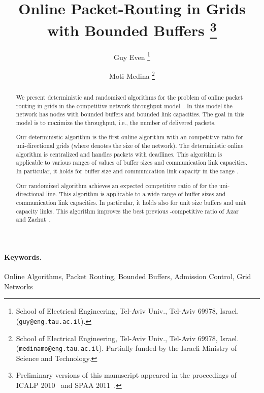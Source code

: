 \documentclass[11pt]{article}
\newenvironment{proof sketch}[1]{\noindent {\emph{Proof sketch of #1:}}}{\hfill \qed}
\begin{document}
 \title{Online Packet-Routing in Grids with Bounded Buffers \thanks{Preliminary
    versions of this manuscript appeared in the proceedings of ICALP
    2010~\cite{DBLP:conf/icalp/EvenM10} and SPAA 2011~\cite{DBLP:conf/spaa/EvenM11}.}
}

\author{Guy Even
\thanks{School of Electrical Engineering, Tel-Aviv Univ., Tel-Aviv 69978, Israel. ({\tt guy@eng.tau.ac.il}).}
\and
Moti Medina
\thanks{School of Electrical Engineering, Tel-Aviv Univ., Tel-Aviv 69978, Israel. ({\tt medinamo@eng.tau.ac.il}).
Partially funded
by the Israeli Ministry of Science and Technology.}}

\maketitle
\begin{abstract}

We present deterministic and randomized algorithms for the problem
  of online packet routing in grids in the competitive network throughput
  model~\cite{AKOR}. In this model the network  has nodes with bounded buffers and bounded
  link capacities. The goal in this model is to maximize the throughput, i.e., the
  number of delivered packets.

  Our deterministic algorithm is the first online
  algorithm with an 
  competitive ratio for uni-directional grids (where 
  denotes the size of the network).  The deterministic
  online algorithm is centralized and handles packets
  with deadlines.  This algorithm is applicable to
  various ranges of values of buffer sizes and
  communication link capacities. In particular, it holds
  for buffer size and communication link capacity in the
  range .

Our randomized algorithm achieves an expected competitive ratio of  for
the uni-directional line. This algorithm is applicable to a wide range of buffer
  sizes and communication link capacities. In particular, it holds also for unit size
  buffers and unit capacity links.  This algorithm improves the best previous
  -competitive ratio of Azar and Zachut~\cite{AZ}.
\end{abstract}

\paragraph{Keywords.}
Online Algorithms, Packet Routing,  Bounded Buffers, Admission Control, Grid Networks
\thispagestyle{empty}
\end{document}
